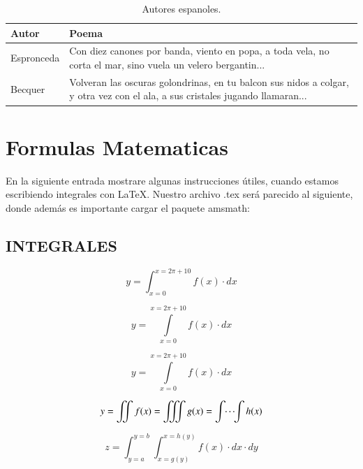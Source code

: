 \documentclass[12pt,letterpaper]{article}
\begin{document}
\begin{table}[H]
\centering
\begin{tabular}{p{2cm} p{5cm}}
\hline
Autor & Poema \\
\hline \hline
Espronceda & Con diez canones por banda, viento en popa, a toda vela, no corta el mar, sino vuela un velero bergantin... \\
\hline
Becquer & Volveran las oscuras golondrinas, en tu balcon sus nidos a colgar, y otra vez con el ala, a sus cristales jugando llamaran... \\
\hline
\end{tabular}
\caption{Autores espanoles.}
\label{tabla:autores}
\end{table}




\newpage


\section{Formulas Matematicas}
En la siguiente entrada mostrare algunas instrucciones útiles, cuando estamos escribiendo 
integrales con LaTeX. Nuestro archivo .tex será parecido al siguiente, donde además es importante cargar el paquete {amsmath}:


\subsection{INTEGRALES}

\begin{equation}
y = \int_{x=0}^{x=2 \pi + 10} f(x) \cdot dx
\end{equation}



\begin{equation}
y = \int \limits_{x=0}^{x=2 \pi + 10} f(x) \cdot dx
\end{equation}



\begin{equation}
y = \int \limits_{x=0}^{x=2 \pi + 10} \!\!\!\!\!\!\! f(x) \cdot dx
\end{equation}



\begin{equation}
y = \iint f(x) = \iiint g(x) = \idotsint h(x) 
\end{equation}



\begin{equation}
z = \int _{y=a}^{y=b} \int _{x=g(y)}^{x=h(y)} f(x) \cdot dx \cdot dy
\end{equation} 
\end{document}

